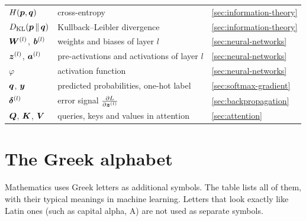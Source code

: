\begin{longtable}{@{}>{\raggedright\arraybackslash}p{3.6cm}
                   >{\raggedright\arraybackslash}p{7.3cm}
                   >{\raggedright\arraybackslash}p{3.0cm}@{}}
$H(\bm{p}, \bm{q})$ & cross-entropy & \cref{sec:information-theory}\\
$D_{\operatorname{KL}}(\bm{p}\,\Vert\,\bm{q})$ & Kullback--Leibler divergence & \cref{sec:information-theory}\\
$\bm{W}^{(l)}$, $\bm{b}^{(l)}$ & weights and biases of layer $l$ & \cref{sec:neural-networks}\\
$\bm{z}^{(l)}$, $\bm{a}^{(l)}$ & pre-activations and activations of layer $l$ & \cref{sec:neural-networks}\\
$\varphi$ & activation function & \cref{sec:neural-networks}\\
$\bm{q}$, $\bm{y}$ & predicted probabilities, one-hot label & \cref{sec:softmax-gradient}\\
$\bm{\delta}^{(l)}$ & error signal $\frac{\partial L}{\partial \bm{z}^{(l)}}$ & \cref{sec:backpropagation}\\
$\bm{Q}$, $\bm{K}$, $\bm{V}$ & queries, keys and values in attention & \cref{sec:attention}\\
\end{longtable}

\clearpage
\section*{The Greek alphabet}
{}

Mathematics uses Greek letters as additional symbols. The table lists all of them,
with their typical meanings in machine learning. Letters that look exactly like
Latin ones (such as capital alpha, A) are not used as separate symbols.


